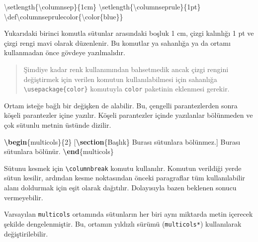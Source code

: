 \documentclass[
  10pt,
]{scrbook}
\newenvironment{Shaded}{\begin{snugshade}}{\end{snugshade}}
\newcommand{\ExtensionTok}[1]{#1}
\newcommand{\FunctionTok}[1]{\textcolor[rgb]{0.00,0.00,0.00}{#1}}
\newcommand{\KeywordTok}[1]{\textcolor[rgb]{0.13,0.29,0.53}{\textbf{#1}}}
\newcommand{\NormalTok}[1]{#1}
\theoremstyle{definition}
\theoremstyle{definition}
\theoremstyle{definition}
\theoremstyle{definition}
\theoremstyle{remark}
\begin{document}
\begin{Shaded}
\begin{Highlighting}[]
\FunctionTok{\textbackslash{}setlength}\NormalTok{\{}\FunctionTok{\textbackslash{}columnsep}\NormalTok{\}\{1cm\}}
\FunctionTok{\textbackslash{}setlength}\NormalTok{\{}\FunctionTok{\textbackslash{}columnseprule}\NormalTok{\}\{1pt\}}
\FunctionTok{\textbackslash{}def\textbackslash{}columnseprulecolor}\NormalTok{\{}\FunctionTok{\textbackslash{}color}\NormalTok{\{blue\}\}}
\end{Highlighting}
\end{Shaded}

Yukarıdaki birinci komutla sütunlar arasındaki boşluk 1 cm, çizgi kalınlığı 1 pt ve çizgi rengi mavi olarak düzenlenir. Bu komutlar ya sahanlığa ya da ortamı kullanmadan önce gövdeye yazılmalıdır.

\begin{quote}
Şimdiye kadar renk kullanımından bahsetmedik ancak çizgi rengini değiştirmek için verilen komutun kullanılabilmesi için sahanlığa \texttt{\textbackslash{}usepackage\{color\}} komutuyla \texttt{color} paketinin eklenmesi gerekir.
\end{quote}

Ortam isteğe bağlı bir değişken de alabilir. Bu, çengelli parantezlerden sonra köşeli parantezler içine yazılır. Köşeli parantezler içinde yazılanlar bölünmeden ve çok sütunlu metnin üstünde dizilir.

\begin{Shaded}
\begin{Highlighting}[]
\KeywordTok{\textbackslash{}begin}\NormalTok{\{}\ExtensionTok{multicols}\NormalTok{\}\{2\}}
\NormalTok{ [}\KeywordTok{\textbackslash{}section}\NormalTok{\{Başlık\}}
\NormalTok{ Burası sütunlara bölünmez.]}
\NormalTok{ Burası sütunlara bölünür.}
\KeywordTok{\textbackslash{}end}\NormalTok{\{}\ExtensionTok{multicols}\NormalTok{\}}
\end{Highlighting}
\end{Shaded}

Sütunu kesmek için \texttt{\textbackslash{}columnbreak} komutu kullanılır. Komutun verildiği yerde sütun kesilir, ardından kesme noktasından önceki paragraflar tüm kullanılabilir alanı doldurmak için eşit olarak dağıtılır. Dolayısıyla bazen beklenen sonucu vermeyebilir.

Varsayılan \texttt{multicols} ortamında sütunların her biri aynı miktarda metin içerecek şekilde dengelenmiştir. Bu, ortamın yıldızlı sürümü (\texttt{multicols*}) kullanılarak değiştirilebilir.
\end{document}
